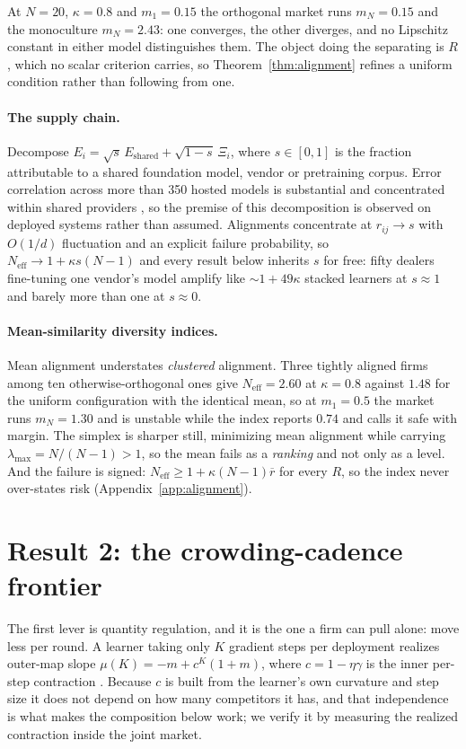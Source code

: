 \documentclass{article}
\theoremstyle{plain}
\theoremstyle{definition}
\newcommand{\Neff}{N_{\mathrm{eff}}}
\newcommand{\mN}{m_N}
\newcommand{\lmax}{\lambda_{\max}}
\begin{document}
At $N=20$, $\kappa=0.8$ and $m_1 = 0.15$ the orthogonal market runs $\mN = 0.15$ and the monoculture $\mN = 2.43$: one converges, the other diverges, and no Lipschitz constant in either model distinguishes them. The object doing the separating is $R$, which no scalar criterion carries, so Theorem~\ref{thm:alignment} refines a uniform condition rather than following from one.

\paragraph{The supply chain.}
Decompose $E_i = \sqrt{s}\,E_{\text{shared}} + \sqrt{1-s}\,\Xi_i$, where $s\in[0,1]$ is the fraction attributable to a shared foundation model, vendor or pretraining corpus. Error correlation across more than 350 hosted models is substantial and concentrated within shared providers \citep{kim2025}, so the premise of this decomposition is observed on deployed systems rather than assumed. Alignments concentrate at $r_{ij}\to s$ with $O(1/d)$ fluctuation and an explicit failure probability, so $\Neff \to 1 + \kappa s (N-1)$ and every result below inherits $s$ for free: fifty dealers fine-tuning one vendor's model amplify like ${\sim}1+49\kappa$ stacked learners at $s\approx 1$ and barely more than one at $s \approx 0$.

\paragraph{Mean-similarity diversity indices.}
Mean alignment understates \emph{clustered} alignment. Three tightly aligned firms among ten otherwise-orthogonal ones give $\Neff = 2.60$ at $\kappa = 0.8$ against $1.48$ for the uniform configuration with the identical mean, so at $m_1 = 0.5$ the market runs $\mN = 1.30$ and is unstable while the index reports $0.74$ and calls it safe with margin. The simplex is sharper still, minimizing mean alignment while carrying $\lmax = N/(N-1) > 1$, so the mean fails as a \emph{ranking} and not only as a level. And the failure is signed: $\Neff \geq 1 + \kappa(N-1)\overline{r}$ for every $R$, so the index never over-states risk (Appendix~\ref{app:alignment}).

\section{Result 2: the crowding-cadence frontier}
\label{sec:cadence}

The first lever is quantity regulation, and it is the one a firm can pull alone: move less per round. A learner taking only $K$ gradient steps per deployment realizes outer-map slope $\mu(K) = -m + c^K(1+m)$, where $c = 1-\eta\gamma$ is the inner per-step contraction \citep{mendlerdunner2020}. Because $c$ is built from the learner's own curvature and step size it does not depend on how many competitors it has, and that independence is what makes the composition below work; we verify it by measuring the realized contraction inside the joint market.
\end{document}
